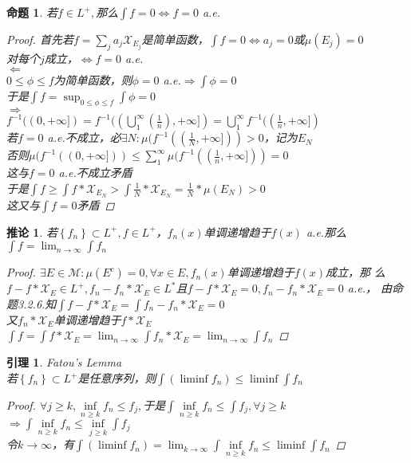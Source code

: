 \documentclass[12pt, a4paper, oneside]{ctexbook}
\newtheorem{lemma}[theorem]{引理}
\newtheorem{corollary}[theorem]{推论}
\newtheorem{proposition}[theorem]{命题}
\begin{document}
\begin{proposition}
    若$f\in L^+,$那么$\int f=0\Leftrightarrow f=0$ a.e.
    \begin{proof}
        首先若$f=\sum_ja_j\mathcal{X}_{E_j}$是简单函数，$\int f=0\Leftrightarrow a_j=0$或$\mu(E_j)=0$\\
        对每个$j$成立，$\Leftrightarrow f=0$ a.e.\\
        $\Leftarrow$\\
        $0\leq\phi\leq f$为简单函数，则$\phi=0$ a.e.$\Rightarrow\int \phi=0$\\
        于是$\int f=\sup_{0\leq\phi\leq f} \int \phi=0$\\
        $\Rightarrow$\\
        $f^{-1}((0,+\infty])=f^{-1}((\bigcup_1^{\infty}(\frac{1}{n}),+\infty])=\bigcup_1^{\infty}f^{-1}((\frac{1}{n},+\infty])$\\
        若$f=0$ a.e.不成立，必$\exists N:\mu(f^{-1}((\frac{1}{N},+\infty]))>0$，记为$E_N$\\
        否则$\mu(f^{-1}((0,+\infty]))\leq\sum_1^{\infty}\mu(f^{-1}((\frac{1}{n},+\infty]))=0$\\
        这与$f=0$ a.e.不成立矛盾\\
        于是$\int f\geq\int f*\mathcal{X}_{E_N}>\int \frac{1}{N}*\mathcal{X}_{E_N}=\frac{1}{N}*\mu(E_N)>0$\\
        这又与$\int f=0$矛盾
    \end{proof}
\end{proposition}
\begin{corollary}
    若$\left\{f_n\right\}\subset L^+,f\in L^+$，$f_n(x)$单调递增趋于$f(x)$ a.e.那么$\int f=\lim_{n\to\infty}\int f_n$
    \begin{proof}
        $\exists E\in\mathcal{M}:\mu(E^c)=0,\forall x\in E,f_n(x)$单调递增趋于$f(x)$成立，那
        么$f-f*\mathcal{X}_E\in L^+,f_n-f_n*\mathcal{X}_E\in L^*$且$f-f*\mathcal{X}_E=0,f_n-f_n*\mathcal{X}_E=0$ a.e.，
        由命题3.2.6.知$\int f-f*\mathcal{X}_E=\int f_n-f_n*\mathcal{X}_E=0$\\
        又$f_n*\mathcal{X}_E$单调递增趋于$f*\mathcal{X}_E$\\
        $\int f=\int f*\mathcal{X}_E=\lim_{n\to\infty}\int f_n*\mathcal{X}_E=\lim_{n\to\infty}\int f_n$
    \end{proof}
\end{corollary}
\begin{lemma}{Fatou's Lemma}
    \\若$\left\{f_n\right\}\subset L^+$是任意序列，则$\int(\liminf f_n)\leq \liminf \int f_n$
    \begin{proof}
        $\forall j\geq k,\underset{n\geq k}{\inf}f_n\leq f_j,$于是$\int \underset{n\geq k}{\inf}f_n\leq \int f_j,\forall j\geq k$\\
        $\Rightarrow \int \underset{n\geq k}{\inf}f_n\leq\underset{j\geq k}{\inf}\int f_j$\\
        令$k\to \infty$，有$\int (\liminf f_n)=\lim_{k\to\infty}\int \underset{n\geq k}{\inf}f_n\leq\liminf \int f_n$
    \end{proof}
\end{lemma}
\end{document}
